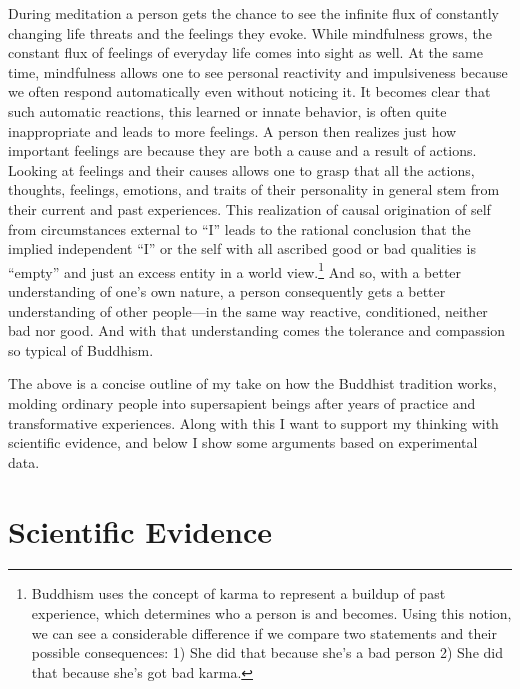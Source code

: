 \documentclass[12pt]{report}
\begin{document}
\noindent During meditation a person gets the chance to see the infinite flux of constantly changing life threats and the feelings they evoke. While mindfulness grows, the constant flux of feelings of everyday life comes into sight as well. At the same time, mindfulness allows one to see personal reactivity and impulsiveness because we often respond automatically even without noticing it. It becomes clear that such automatic reactions, this learned or innate behavior, is often quite inappropriate and leads to more feelings. A person then realizes just how important feelings are because they are both a cause and a result of actions. Looking at feelings and their causes allows one to grasp that all the actions, thoughts, feelings, emotions, and traits of their personality in general stem from their current and past experiences. This realization of causal origination of self from circumstances external to ``I'' leads to the rational conclusion that the implied independent ``I'' or the self with all ascribed good or bad qualities is ``empty'' and just an excess entity in a world view.\footnote{Buddhism uses the concept of karma to represent a buildup of past experience, which determines who a person is and becomes. Using this notion, we can see a considerable difference if we compare two statements and their possible consequences: 1) She did that because she’s a bad person 2) She did that because she’s got bad karma.} And so, with a better understanding of one’s own nature, a person consequently gets a better understanding of other people\thinspace---\thinspace in the same way reactive, conditioned, neither bad nor good. And with that understanding comes the tolerance and compassion so typical of Buddhism.

\noindent The above is a concise outline of my take on how the Buddhist tradition works, molding ordinary people into supersapient beings after years of practice and transformative experiences. Along with this I want to support my thinking with scientific evidence, and below I show some arguments based on experimental data.

\section*{Scientific Evidence}
\end{document}
